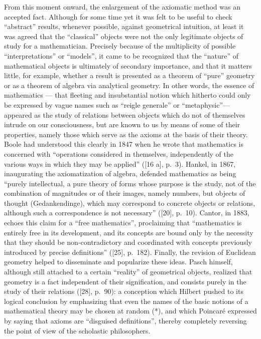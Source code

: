 From this moment onward, the enlargement of the axiomatic method was an accepted fact. Although for some time yet it was felt to be useful to check ``abstract'' results, whenever possible, against geometrical intuition, at least it was agreed that the ``classical'' objects were not the only legitimate objects of study for a mathematician. Precisely because of the multiplicity of possible ``interpretations'' or ``models'', it came to be recognized that the ``nature'' of mathematical objects is ultimately of secondary importance, and that it matters little, for example, whether a result is presented as a theorem of ``pure'' geometry or as a theorem of algebra via analytical geometry. In other words, the essence of mathematics --- that fleeting and insubstantial notion which hitherto could only be expressed by vague names such as ``reigle generale'' or ``metaphysic''---appeared as the study of relations between objects which do not of themselves intrude on our consciousness, but are known to us by means of some of their properties, namely those which serve as the axioms at the basis of their theory. Boole had understood this clearly in 1847 when he wrote that mathematics is concerned with ``operations considered in themselves, independently of the various ways in which they may be applied'' ({[}16 a{]}, p.~3). Hankel, in 1867, inaugurating the axiomatization of algebra, defended mathematics as being ``purely intellectual, a pure theory of forms whose purpose is the study, not of the combination of magnitudes or of their images, namely numbers, but objects of thought (Gedankendinge), which may correspond to concrete objects or relations, although such a correspondence is not necessary'' ({[}20{]}, p.~10). Cantor, in 1883, echoes this claim for a ``free mathematics'', proclaiming that ``mathematics is entirely free in its development, and its concepts are bound only by the necessity that they should be non-contradictory and coordinated with concepts previously introduced by precise definitions'' ({[}25{]}, p.~182). Finally, the revision of Euclidean geometry helped to disseminate and popularize these ideas. Pasch himself, although still attached to a certain ``reality'' of geometrical objects, realized that geometry is a fact independent of their signification, and consists purely in the study of their relations ({[}28{]}, p.~90): a conception which Hilbert pushed to its logical conclusion by emphasizing that even the names of the basic notions of a mathematical theory may be chosen at random (*), and which Poincaré expressed by saying that axioms are ``disguised definitions'', thereby completely reversing the point of view of the scholastic philosophers.


